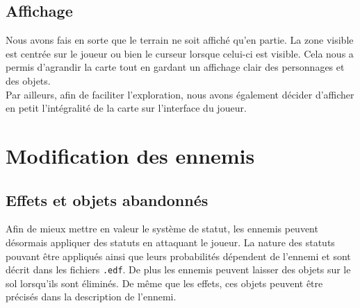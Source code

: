 \documentclass[10pt,a4paper]{article}
\begin{document}
\subsection{Affichage}
Nous avons fais en sorte que le terrain ne soit affiché qu'en partie. La zone visible est centrée sur le joueur ou bien le curseur lorsque celui-ci est visible. Cela nous a permis d'agrandir la carte tout en gardant un affichage clair des personnages et des objets.\\
Par ailleurs, afin de faciliter l'exploration, nous avons également décider d'afficher en petit l'intégralité de la carte sur l'interface du joueur.

\section{Modification des ennemis}
\subsection{Effets et objets abandonnés}
Afin de mieux mettre en valeur le système de statut, les ennemis peuvent désormais appliquer des statuts en attaquant le joueur. La nature des statuts pouvant être appliqués ainsi que leurs probabilités dépendent de l'ennemi et sont décrit dans les fichiers \texttt{.edf}. De plus les ennemis peuvent laisser des objets sur le sol lorsqu'ils sont éliminés. De même que les effets, ces objets peuvent être précisés dans la description de l'ennemi.
\end{document}
